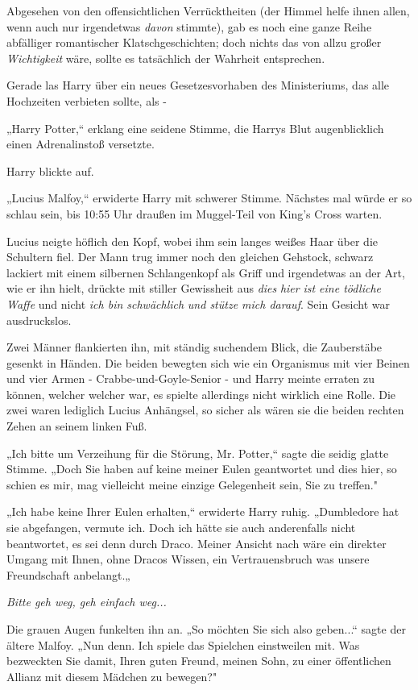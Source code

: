 {Abgesehen von den offensichtlichen Verrücktheiten (der Himmel helfe ihnen allen, wenn auch nur irgendetwas \emph{davon} stimmte), gab es noch eine ganze Reihe abfälliger romantischer Klatschgeschichten; doch nichts das von allzu großer \emph{Wichtigkeit} wäre, sollte es tatsächlich der Wahrheit entsprechen.

Gerade las Harry über ein neues Gesetzesvorhaben des Ministeriums, das alle Hochzeiten verbieten sollte, als -

„Harry Potter,“ erklang eine seidene Stimme, die Harrys Blut augenblicklich einen Adrenalinstoß versetzte.

Harry blickte auf.

„Lucius Malfoy,“ erwiderte Harry mit schwerer Stimme. Nächstes mal würde er so schlau sein, bis 10:55 Uhr draußen im Muggel-Teil von King's Cross warten.

Lucius neigte höflich den Kopf, wobei ihm sein langes weißes Haar über die Schultern fiel. Der Mann trug immer noch den gleichen Gehstock, schwarz lackiert mit einem silbernen Schlangenkopf als Griff und irgendetwas an der Art, wie er ihn hielt, drückte mit stiller Gewissheit aus \emph{dies} \emph{hier} \emph{ist eine tödliche Waffe} und nicht \emph{ich bin schwächlich} \emph{und stütze mich darauf}. Sein Gesicht war ausdruckslos.

Zwei Männer flankierten ihn, mit ständig suchendem Blick, die Zauberstäbe gesenkt in Händen. Die beiden bewegten sich wie ein Organismus mit vier Beinen und vier Armen - Crabbe-und-Goyle-Senior - und Harry meinte erraten zu können, welcher welcher war, es spielte allerdings nicht wirklich eine Rolle. Die zwei waren lediglich Lucius Anhängsel, so sicher als wären sie die beiden rechten Zehen an seinem linken Fuß.

„Ich bitte um Verzeihung für die Störung, Mr. Potter,“ sagte die seidig glatte Stimme. „Doch Sie haben auf keine meiner Eulen geantwortet und dies hier, so schien es mir, mag vielleicht meine einzige Gelegenheit sein, Sie zu treffen."

„Ich habe keine Ihrer Eulen erhalten,“ erwiderte Harry ruhig. „Dumbledore hat sie abgefangen, vermute ich. Doch ich hätte sie auch anderenfalls nicht beantwortet, es sei denn durch Draco. Meiner Ansicht nach wäre ein direkter Umgang mit Ihnen, ohne Dracos Wissen, ein Vertrauensbruch was unsere Freundschaft anbelangt.„

\emph{Bitte geh weg, geh einfach weg...}

Die grauen Augen funkelten ihn an. „So möchten Sie sich also geben...“ sagte der ältere Malfoy. „Nun denn. Ich spiele das Spielchen einstweilen mit. Was bezweckten Sie damit, Ihren guten Freund, meinen Sohn, zu einer öffentlichen Allianz mit diesem Mädchen zu bewegen?"

}
